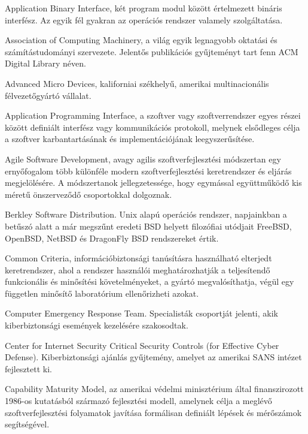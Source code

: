 \documentclass[12pt,magyar,a4paper,oneside]{scrreprt}
\providecommand{\tightlist}{%
  \setlength{\itemsep}{0pt}\setlength{\parskip}{0pt}}
\begin{document}
\begin{description}
\tightlist
\item[ABI]
Application Binary Interface, két program modul között értelmezett
bináris interfész. Az egyik fél gyakran az operációs rendszer valamely
szolgáltatása.
\item[ACM]
Association of Computing Machinery, a világ egyik legnagyobb oktatási és
számítástudományi szervezete. Jelentős publikációs gyűjteményt tart fenn
ACM Digital Library néven.
\item[AMD]
Advanced Micro Devices, kaliforniai székhelyű, amerikai multinacionális
félvezetőgyártó vállalat.
\item[API]
Application Programming Interface, a szoftver vagy szoftverrendszer
egyes részei között definiált interfész vagy kommunikációs protokoll,
melynek elsődleges célja a szoftver karbantartásának és
implementációjának leegyszerűsítése.
\item[ASD]
Agile Software Development, avagy agilis szoftverfejlesztési módszertan
egy ernyőfogalom több különféle modern szoftverfejlesztési keretrendszer
és eljárás megjelölésére. A módszertanok jellegzetessége, hogy egymással
együttműködő kis méretű önszerveződő csoportokkal dolgoznak.
\item[BSD]
Berkley Software Distribution. Unix alapú operációs rendszer,
napjainkban a betűszó alatt a már megszűnt eredeti BSD helyett
filozófiai utódjait FreeBSD, OpenBSD, NetBSD és DragonFly BSD
rendszereket értik.
\item[CC]
Common Criteria, információbiztonsági tanúsításra használható elterjedt
keretrendszer, ahol a rendszer használói meghatározhatják a teljesítendő
funkcionális és minősítési követelményeket, a gyártó megvalósíthatja,
végül egy független minősítő laboratórium ellenőrizheti azokat.
\item[CERT]
Computer Emergency Response Team. Specialisták csoportját jelenti, akik
kiberbiztonsági események kezelésére szakosodtak.
\item[CIS CSC]
Center for Internet Security Critical Security Controls (for Effective
Cyber Defense). Kiberbiztonsági ajánlás gyűjtemény, amelyet az amerikai
SANS intézet fejlesztett ki.
\item[CMM]
Capability Maturity Model, az amerikai védelmi minisztérium által
finanszirozott 1986-os kutatásból származó fejlesztési modell, amelynek
célja a meglévő szoftverfejlesztési folyamatok javítása formálisan
definiált lépések és mérőszámok segítségével.
\item[COBIT]

\end{description}
\end{document}
